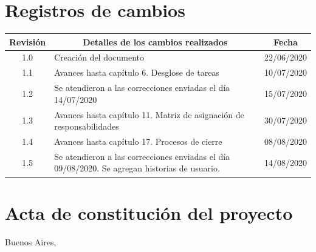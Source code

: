 \documentclass[11pt]{charter}
\begin{document}
\maketitle
\thispagestyle{empty}
\pagebreak


\thispagestyle{empty}
{\setlength{\parskip}{0pt}
\tableofcontents{}
}
\pagebreak


\section{Registros de cambios}
\label{sec:registro}


\begin{table}[ht]
\label{tab:registro}
\centering

\begin{tabularx}{\linewidth}{@{}|c|X|c|@{}}
\hline
\rowcolor[HTML]{C0C0C0} 
Revisión & \multicolumn{1}{c|}{\cellcolor[HTML]{C0C0C0}Detalles de los cambios realizados} & Fecha      \\ \hline
1.0      & Creación del documento                                                          & 22/06/2020 \\ \hline
1.1      & Avances hasta capítulo 6. Desglose de tareas									   & 10/07/2020 \\ \hline
1.2      & Se atendieron a las correcciones enviadas el día 14/07/2020                     & 15/07/2020 \\ \hline
1.3      & Avances hasta capítulo 11. Matriz de asignación de responsabilidades            & 30/07/2020 \\ \hline
1.4      & Avances hasta capítulo 17. Procesos de cierre          						   & 08/08/2020 \\ \hline
1.5      & Se atendieron a las correcciones enviadas el día 09/08/2020. Se agregan historias de usuario.	& 14/08/2020 \\ \hline
\end{tabularx}
\end{table}

\pagebreak



\section{Acta de constitución del proyecto}
\label{sec:acta}

\begin{flushright}
Buenos Aires, \fechaInicioName
\end{flushright}
\end{document}
